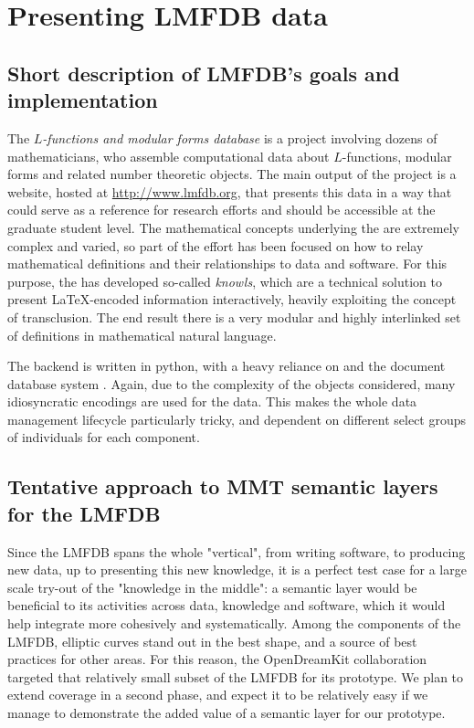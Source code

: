 \section{Presenting LMFDB data}
\subsection{Short description of LMFDB's goals and implementation}
The \emph{$L$-functions and modular forms database} is a project involving dozens of  mathematicians, who assemble computational data about $L$-functions, modular  forms and related number theoretic objects. The main output of the project is a website, hosted at \url{http://www.lmfdb.org}, that presents this data in a way that could serve as a reference for research efforts and should be accessible at the graduate student level.  The mathematical concepts underlying the \LMFDB are extremely complex and varied, so part of the effort has been focused on how to relay mathematical definitions and their relationships to data and software. For this purpose, the \LMFDB has developed so-called \emph{knowls}, which are a technical solution to present \LaTeX-encoded information interactively, heavily exploiting the concept of transclusion. The end result there is a very modular and highly interlinked set of definitions in mathematical natural language. 
 
The \LMFDB backend is written in \textsf{python}, with a heavy reliance on \Sage and the document database system \Mongo \cite{lmfdb-repo}. Again, due to the complexity of the objects considered, many idiosyncratic encodings are used for the data. This makes the whole data management lifecycle particularly tricky, and dependent on different select groups of individuals for each component. 

\subsection{Tentative approach to MMT semantic layers for the LMFDB}
Since the LMFDB spans the whole "vertical", from writing software, to producing new data, up to presenting this new knowledge,  it is a perfect test case for a large scale try-out of the "knowledge in the middle": a semantic layer would be beneficial to its activities across data, knowledge and software, which it would help integrate more cohesively and systematically. Among the components of the LMFDB, elliptic curves stand out in the best shape, and a source of best practices for other areas. For this reason, the OpenDreamKit collaboration targeted that relatively small subset of the LMFDB for its prototype. We plan to extend coverage in a second phase, and expect it to be relatively easy if we manage to demonstrate the added value of a semantic layer for our prototype. 

